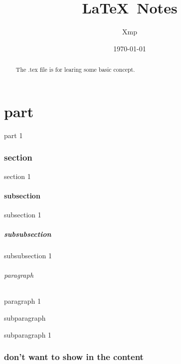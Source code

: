 \documentclass{article}
\title{\LaTeX \ Notes}
\author{Xmp}
\date{\today}
\begin{document}
\maketitle

\setcounter{tocdepth}{2}%
\tableofcontents %
\listoffigures %
\listoftables %

\begin{abstract}%
	The .tex file is for learing some basic concept.
\end{abstract}

\part{part}%
part 1

\section{section}%
section 1

\subsection{subsection}%
subsection 1

\subsubsection{subsubsection}%
subsubsection 1

\paragraph{paragraph}%
paragraph 1

\subparagraph{subparagraph}%
subparagraph 1


\section*{don't want to show in the content}
\end{document}
